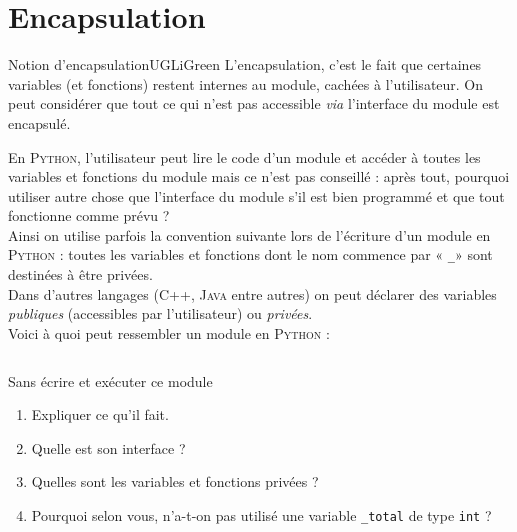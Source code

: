 \documentclass[a4paper,10pt,cours]{nsi}
\begin{document}
\section{Encapsulation}


\begin{encadrecolore}{Notion d'encapsulation}{UGLiGreen}
    L'encapsulation, c'est le fait que certaines variables (et fonctions) restent internes au module, cachées à l'utilisateur. On peut considérer que tout ce qui n'est pas accessible \textit{via} l'interface du module est encapsulé.
\end{encadrecolore}
En \textsc{Python}, l'utilisateur peut lire le code d'un module et accéder à toutes les variables et fonctions du module mais ce n'est pas conseillé : après tout, pourquoi utiliser autre chose que l'interface du module s'il est bien programmé et que tout fonctionne comme prévu ?\\
Ainsi on utilise parfois la convention suivante lors de l'écriture d'un module en \textsc{Python} : toutes les variables et fonctions dont le nom commence par « \texttt{\_}» sont destinées à être privées.\\
Dans d'autres langages (\textsc{C++}, \textsc{Java} entre autres) on peut déclarer des variables \textit{publiques} (accessibles par l'utilisateur) ou \textit{privées}.\\

Voici à quoi peut ressembler un module en \textsc{Python} :

\inputminted{python}{scripts/bidon.py}

\begin{exercice}[]
    Sans écrire et exécuter ce module
    \begin{enumerate}
        \item 	Expliquer ce qu'il fait.
        \item 	Quelle est son interface ?
        \item 	Quelles sont les variables et fonctions privées ?
        \item 	Pourquoi selon vous, n'a-t-on pas utilisé une variable \texttt{_total} de type \texttt{int} ?
    \end{enumerate}
\end{exercice}
\end{document}
